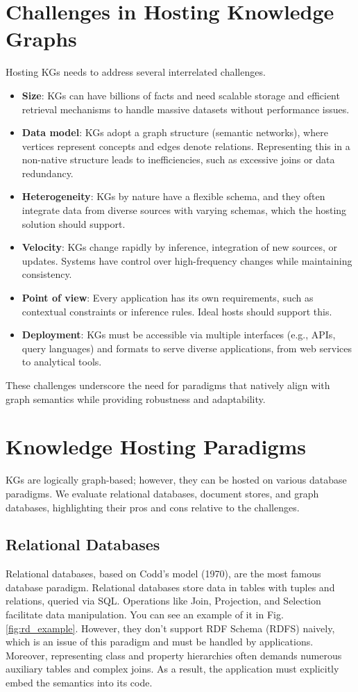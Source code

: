 \documentclass[12pt]{article}
\begin{document}
\section{Challenges in Hosting Knowledge Graphs}
Hosting KGs needs to address several interrelated challenges.
\begin{itemize}
    \item \textbf{Size}: KGs can have billions of facts and need scalable storage and efficient retrieval mechanisms to handle massive datasets without performance issues.
    \item \textbf{Data model}: KGs adopt a graph structure (semantic networks), where vertices represent concepts and edges denote relations. Representing this in a non-native structure leads to inefficiencies, such as excessive joins or data redundancy.
    \item \textbf{Heterogeneity}: KGs by nature have a flexible schema, and they often integrate data from diverse sources with varying schemas, which the hosting solution should support.
    \item \textbf{Velocity}: KGs change rapidly by inference, integration of new sources, or updates. Systems have control over high-frequency changes while maintaining consistency.
    \item \textbf{Point of view}: Every application has its own requirements, such as contextual constraints or inference rules. Ideal hosts should support this.
    \item \textbf{Deployment}: KGs must be accessible via multiple interfaces (e.g., APIs, query languages) and formats to serve diverse applications, from web services to analytical tools.

\end{itemize}
These challenges underscore the need for paradigms that natively align with graph semantics while providing robustness and adaptability.
\section{Knowledge Hosting Paradigms}
KGs are logically graph-based; however, they can be hosted on various database paradigms. We evaluate relational databases, document stores, and graph databases, highlighting their pros and cons relative to the challenges.
\subsection{Relational Databases}
Relational databases, based on Codd's model (1970), are the most famous database paradigm. Relational databases store data in tables with tuples and relations, queried via SQL. Operations like Join, Projection, and Selection facilitate data manipulation. You can see an example of it in Fig. \ref{fig:rd_example}. However, they don’t support RDF Schema (RDFS) naively, which is an issue of this paradigm and must be handled by applications. Moreover, representing class and property hierarchies often demands numerous auxiliary tables and complex joins. As a result, the application must explicitly embed the semantics into its code.
\end{document}
